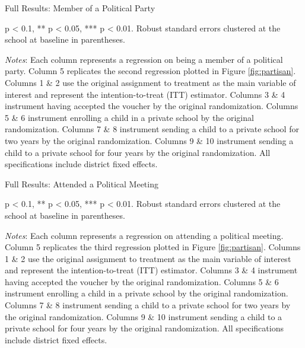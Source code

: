 \documentclass[hidelinks, 12pt, titlepage]{article}
\begin{document}
\begin{landscape}
					\begin{table}
						\begin{threeparttable}
							\centering
							\caption{Full Results: Member of a Political Party\label{table:appendixpoliticalparty}}
							
							\begin{tablenotes}
								\item * p < 0.1, ** p < 0.05, *** p < 0.01. Robust standard errors clustered at the school at baseline in parentheses.
								\item \emph{Notes}: Each column represents a regression on being a member of a political party.  Column 5 replicates the second regression plotted in Figure \ref{fig:partisan}.  Columns 1 \& 2 use the original assignment to treatment as the main variable of interest and represent the intention-to-treat (ITT) estimator.  Columns 3 \& 4 instrument having accepted the voucher by the original randomization.  Columns 5 \& 6 instrument enrolling a child in a private school by the original randomization.  Columns 7 \& 8 instrument sending a child to a private school for two years by the original randomization.  Columns 9 \& 10 instrument sending a child to a private school for four years by the original randomization.  All specifications include district fixed effects.
							\end{tablenotes}
						\end{threeparttable}
					\end{table}
					\clearpage

					\begin{table}
						\begin{threeparttable}
							\centering
							\caption{Full Results: Attended a Political Meeting\label{table:appendixpoliticalmeeting}}
							
							\begin{tablenotes}
								\item * p < 0.1, ** p < 0.05, *** p < 0.01. Robust standard errors clustered at the school at baseline in parentheses.
								\item \emph{Notes}: Each column represents a regression on attending a political meeting.  Column 5 replicates the third regression plotted in Figure \ref{fig:partisan}.  Columns 1 \& 2 use the original assignment to treatment as the main variable of interest and represent the intention-to-treat (ITT) estimator.  Columns 3 \& 4 instrument having accepted the voucher by the original randomization.  Columns 5 \& 6 instrument enrolling a child in a private school by the original randomization.  Columns 7 \& 8 instrument sending a child to a private school for two years by the original randomization.  Columns 9 \& 10 instrument sending a child to a private school for four years by the original randomization.  All specifications include district fixed effects.
							\end{tablenotes}
						\end{threeparttable}
					\end{table}


\end{landscape}
\end{document}

